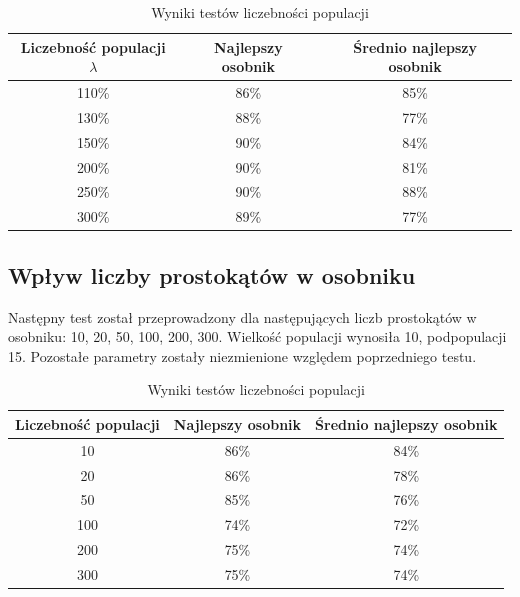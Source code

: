 \begin{table}[H]
    \centering
    \begin{tabular}{|c|c|c|}
    \hline
    Liczebność populacji $\lambda$  & Najlepszy osobnik & Średnio najlepszy osobnik \\ \hline
    110\%                           & 86\%              & 85\%                      \\ \hline
    130\%                           & 88\%              & 77\%                      \\ \hline
    150\%                           & 90\%              & 84\%                      \\ \hline
    200\%                           & 90\%              & 81\%                      \\ \hline
    250\%                           & 90\%              & 88\%                      \\ \hline
    300\%                           & 89\%              & 77\%                      \\ \hline
    \end{tabular}
    \caption{Wyniki testów liczebności populacji}
    \label{tab:crossing}
\end{table}



\subsection*{Wpływ liczby prostokątów w osobniku}
Następny test został przeprowadzony dla następujących liczb prostokątów w osobniku: 10, 20, 50, 100, 200, 300. Wielkość populacji wynosiła 10, podpopulacji 15. Pozostałe parametry zostały niezmienione względem poprzedniego testu. 

\begin{table}[H]
    \centering
    \begin{tabular}{|c|c|c|}
    \hline
    Liczebność populacji    & Najlepszy osobnik & Średnio najlepszy osobnik \\ \hline
    10                      & 86\%              & 84\%                      \\ \hline
    20                      & 86\%              & 78\%                      \\ \hline
    50                      & 85\%              & 76\%                      \\ \hline
    100                     & 74\%              & 72\%                      \\ \hline
    200                     & 75\%              & 74\%                      \\ \hline
    300                     & 75\%              & 74\%                      \\ \hline
    \end{tabular}
    \caption{Wyniki testów liczebności populacji}
    \label{tab:crossing}
\end{table}

